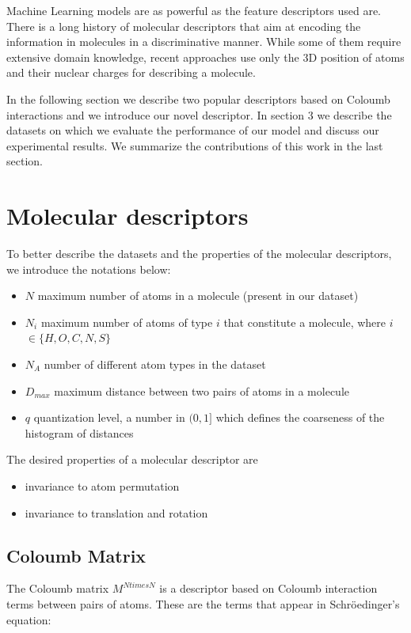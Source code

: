 \documentclass{article}
\begin{document}
Machine Learning models are as powerful as the feature descriptors used are. There is a long history of molecular descriptors \cite{todeschini2000handbook} that aim at encoding the information in molecules in a discriminative manner. While some of them require extensive domain knowledge, recent approaches \cite{initialcoloumb} use only the 3D position of atoms and their nuclear charges for describing a molecule.

In the following section we describe two popular descriptors based on Coloumb interactions and we introduce our novel descriptor. In section 3 we describe the datasets on which we evaluate the performance of our model and discuss our experimental results. We summarize the contributions of this work in the last section.

\section{Molecular descriptors}

To better describe the datasets and the properties of the molecular descriptors, we introduce the notations below:
\begin{itemize}
\item $N$ maximum number of atoms in a molecule (present in our dataset)
\item $N_i$ maximum number of atoms of type $i$ that constitute a molecule, where $i$ $\in \{H, O, C, N, S\}$
\item $N_A$ number of different atom types in the dataset
\item $D_{max}$ maximum distance between two pairs of atoms in a molecule
\item $q$ quantization level, a number in $(0,1]$ which defines the coarseness of the histogram of distances
\end{itemize}
The desired properties of a molecular descriptor are
\begin{itemize}
 \item invariance to atom permutation
 \item invariance to translation and rotation
\end{itemize}

\subsection{Coloumb Matrix}
The Coloumb matrix\citep{initialcoloumb} $M^{N
times N}$ is a descriptor based on  Coloumb interaction terms between pairs of atoms. These are the terms that appear in Schröedinger's equation:
\end{document}
